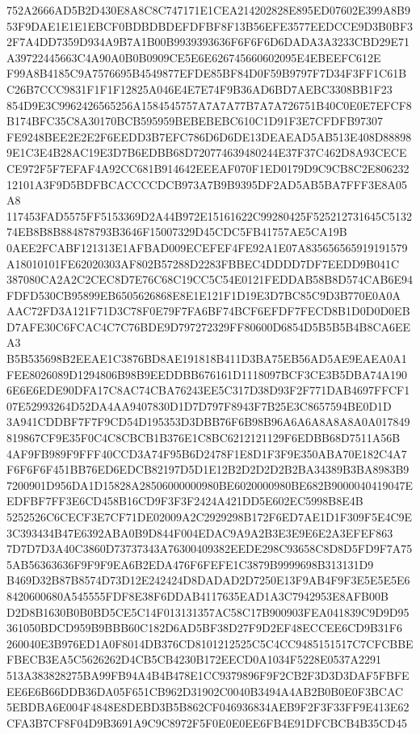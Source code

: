 \documentclass[UTF8,fontset=fandol,zihao=-4,a4paper]{ctexart}
\begin{document}
{{752A2666AD5B2D430E8A8C8C747171E1CEA214202828E895ED07602E399A8B953F9DAE1E1E1EBCF0BDBDBDEFDFBF8F13B56EFE3577EEDCCE9D3B0BF3
2F7A4DD7359D934A9B7A1B00B9939393636F6F6F6D6DADA3A3233CBD29E71A39722445663C4A90A0B0B0909CE5E6E626745660602095E4EBEEFC612E
F99A8B4185C9A7576695B4549877EFDE85BF84D0F59B9797F7D34F3FF1C61BC26B7CCC9831F1F1F12825A046E4E7E74F9B36AD6BD7AEBC3308BB1F23
854D9E3C9962426565256A1584545757A7A7A77B7A7A726751B40C0E0E7EFCF8B174BFC35C8A30170BCB595959BEBEBEBC610C1D91F3E7CFDFB97307
FE9248BEE2E2E2F6EEDD3B7EFC786D6D6DE13DEAEAD5AB513E408D888989E1C3E4B28AC19E3D7B6EDBB68D720774639480244E37F37C462D8A93CECE
CE972F5F7EFAF4A92CC681B914642EEEAF070F1ED0179D9C9CB8C2E80623212101A3F9D5BDFBCACCCCDCB973A7B9B9395DF2AD5AB5BA7FFF3E8A05A8
117453FAD5575FF5153369D2A44B972E15161622C99280425F525212731645C513274EB8B8B884878793B3646F15007329D45CDC5FB41757AE5CA19B
0AEE2FCABF121313E1AFBAD009ECEFEF4FE92A1E07A835656565919191579A18010101FE62020303AF802B57288D2283FBBEC4DDDD7DF7EEDD9B041C
387080CA2A2C2CEC8D7E76C68C19CC5C54E0121FEDDAB58B8D574CAB6E94FDFD530CB95899EB6505626868E8E1E121F1D19E3D7BC85C9D3B770E0A0A
AAC72FD3A121F71D3C78F0E79F7FA6BF74BCF6EFDF7FECD8B1D0D0D0EBD7AFE30C6FCAC4C7C76BDE9D797272329FF80600D6854D5B5B5B4B8CA6EEA3
B5B535698B2EEAE1C3876BD8AE191818B411D3BA75EB56AD5AE9EAEA0A1FEE8026089D1294806B98B9EEDDBB676161D1118097BCF3CE3B5DBA74A190
6E6E6EDE90DFA17C8AC74CBA76243EE5C317D38D93F2F771DAB4697FFCF107E52993264D52DA4AA9407830D1D7D797F8943F7B25E3C8657594BE0D1D
3A941CDDBF7F7F9CD54D195353D3DBB76F6B98B96A6A6A8A8A8A0A017849819867CF9E35F0C4C8CBCB1B376E1C8BC6212121129F6EDBB68D7511A56B
4AF9FB989F9FFF40CCD3A74F95B6D2478F1E8D1F3F9E350ABA70E182C4A7F6F6F6F451BB76ED6EDCB82197D5D1E12B2D2D2D2B2BA34389B3BA8983B9
7200901D956DA1D15828A28506000000980BE6020000980BE682B9000040419047EEDFBF7FF3E6CD458B16CD9F3F3F2424A421DD5E602EC5998B8E4B
5252526C6CECF3E7CF71DE02009A2C2929298B172F6ED7AE1D1F309F5E4C9E3C393434B47E6392ABA0B9D844F004EDAC9A9A2B3E3E9E6E2A3EFEF863
7D7D7D3A40C3860D73737343A76300409382EEDE298C93658C8D8D5FD9F7A755AB56363636F9F9F9EA6B2EDA476F6FEFE1C3879B9999698B313131D9
B469D32B87B8574D73D12E242424D8DADAD2D7250E13F9AB4F9F3E5E5E5E68420600680A545555FDF8E38F6DDAB4117635EAD1A3C7942953E8AFB00B
D2D8B1630B0B0BD5CE5C14F013131357AC58C17B900903FEA041839C9D9D95361050BDCD959B9BBB60C182D6AD5BF38D27F9D2EF48ECCEE6CD9B31F6
260040E3B976ED1A0F8014DB376CD8101212525C5C4CC9485151517C7CFCBBEFBECB3EA5C5626262D4CB5CB4230B172EECD0A1034F5228E0537A2291
513A383828275BA99FB94A4B4B478E1CC9379896F9F2CB2F3D3D3DAF5FBFEEE6E6B66DDB36DA05F651CB962D31902C0040B3494A4AB2B0B0E0F3BCAC
5EBDBA6E004F4848E8DEBD3B5B862CF046936834AEB9F2F3F33FF9E413E62CFA3B7CF8F04D9B3691A9C9C8972F5F0E0E0EE6FB4E91DFCBCB4B35CD45
}}
\end{document}
